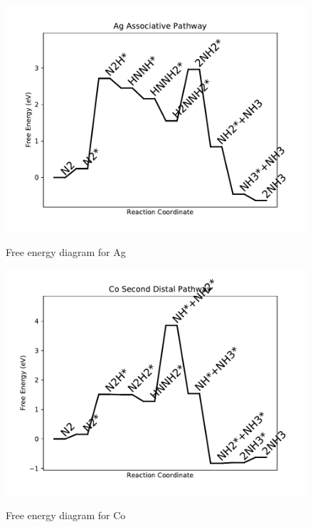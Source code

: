 \documentclass{article}
\begin{document}
\begin{figure}
\includegraphics[width=1\linewidth]{data/plots/Ag_associative.pdf}
\label{fig:Ag_associative}
\caption{Free energy diagram for Ag}
\end{figure}

\begin{figure}
\includegraphics[width=1\linewidth]{data/plots/Co_distal_2.pdf}
\label{fig:Co_distal_2}
\caption{Free energy diagram for Co}
\end{figure}
\end{document}
